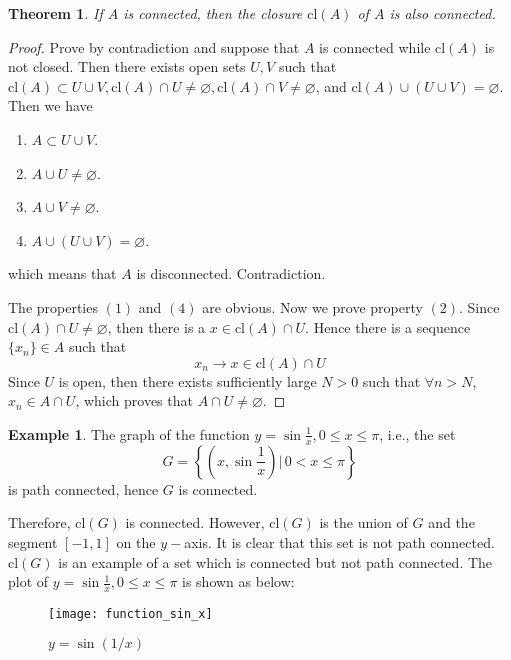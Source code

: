 \documentclass[12pt,leqno]{amsart}
\newtheorem{theorem}{Theorem}[section]
\theoremstyle{definition}
\newtheorem{example}{Example}[section]
\numberwithin{equation}{subsection}
\begin{document}
\medskip

\begin{theorem}
If $A$ is connected, then the closure $\text{cl}(A)$ of $A$ is also connected.
\end{theorem}
\begin{proof}
Prove by contradiction and suppose that $A$ is connected while $\text{cl}(A)$ is not closed. Then there exists open sets $U,V$ such that $\text{cl}(A)\subset U\cup V, \text{cl}(A)\cap U \neq\varnothing, \text{cl}(A)\cap V \neq\varnothing$, and $\text{cl}(A)\cup (U \cup V) = \varnothing$. Then we have 
\begin{enumerate}
    \item $A\subset U\cup V$.
    \item $A\cup U \neq\varnothing$.
    \item $A\cup V \neq\varnothing$.
    \item $A\cup (U \cup V) = \varnothing$.
\end{enumerate}
which means that $A$ is disconnected. Contradiction. 

The properties $(1)$ and $(4)$ are obvious. Now we prove property $(2)$. Since $\text{cl}(A)\cap U \neq\varnothing$, then there is a $x\in \text{cl}(A)\cap U$. Hence there is a sequence $\{x_n\}\in A$ such that $$x_n\to x\in \text{cl}(A)\cap U$$
Since $U$ is open, then there exists sufficiently large $N > 0$ such that $\forall n>N$, $x_n\in A\cap U$, which proves that $A\cap U\neq\varnothing$.
\end{proof}

\begin{example}
The graph of the function $y = \sin \frac{1}{x}, 0\leq x\leq \pi$, i.e., the set  $$G = \left\{(x, \sin \frac{1}{x})|\, 0< x\leq \pi\right\}$$
is path connected, hence $G$ is connected.

Therefore, $\text{cl}(G)$ is connected. However, $\text{cl}(G)$ is the union of $G$ and the segment $[-1,1]$ on the $y-$axis. It is clear that this set is not path connected. $\text{cl}(G)$ is an example of a set which is connected but not path connected. The plot of $y = \sin \frac{1}{x}, 0\leq x\leq \pi$ is shown as below:
\begin{figure}[h]
    \centering
    \texttt{[image: function\_sin\_x]}
    \caption{$y = \sin(1/x)$}
    \label{fig:function_sin_x}
\end{figure}
\end{example}

\medskip
\end{document}
